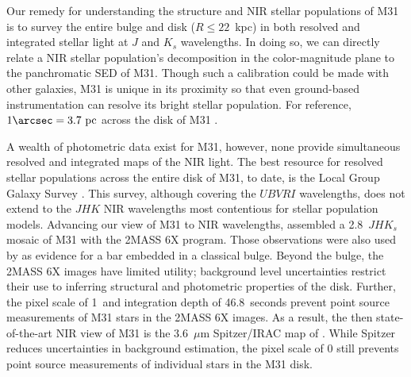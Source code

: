 \documentclass[iop,tighten]{emulateapj}
\begin{document}
Our remedy for understanding the structure and NIR stellar populations of M31 is to survey the entire bulge and disk ($R \leq 22$~kpc) in both resolved and integrated stellar light at $J$ and $K_s$ wavelengths.
In doing so, we can directly relate a NIR stellar population's decomposition in the color-magnitude plane to the panchromatic SED of M31.
Though such a calibration could be made with other galaxies, M31 is unique in its proximity so that even ground-based instrumentation can resolve its bright stellar population.
For reference, $1\arcsec = 3.7~\mathrm{pc}$ across the disk of M31 \citep[we adopt $D_\mathrm{M31} = 785$~kpc,][]{McConnachie:2005}.

A wealth of photometric data exist for M31, however, none provide simultaneous resolved and integrated maps of the NIR light.
The best resource for resolved stellar populations across the entire disk of M31, to date, is the Local Group Galaxy Survey \cite[LGGS,][]{Williams:2003,Massey:2006}.
This survey, although covering the $UBVRI$ wavelengths, does not extend to the $JHK$ NIR wavelengths most contentious for stellar population models.
Advancing our view of M31 to NIR wavelengths, \cite{Beaton:2007} assembled a 2.8\arcdeg\ $JHK_s$ mosaic of M31 with the 2MASS 6X program.
Those observations were also used by \cite{Athanassoula:2006} as evidence for a bar embedded in a classical bulge.
Beyond the bulge, the 2MASS 6X images have limited utility; background level uncertainties restrict their use to inferring structural and photometric properties of the disk.
Further, the pixel scale of 1\arcsec\ and integration depth of 46.8~seconds prevent point source measurements of M31 stars in the 2MASS 6X images.
As a result, the then state-of-the-art NIR view of M31 is the 3.6~$\mu$m Spitzer/IRAC map of \cite{Barmby:2006}.
While Spitzer reduces uncertainties in background estimation, the pixel scale of 0 still prevents point source measurements of individual stars in the M31 disk.
\end{document}
